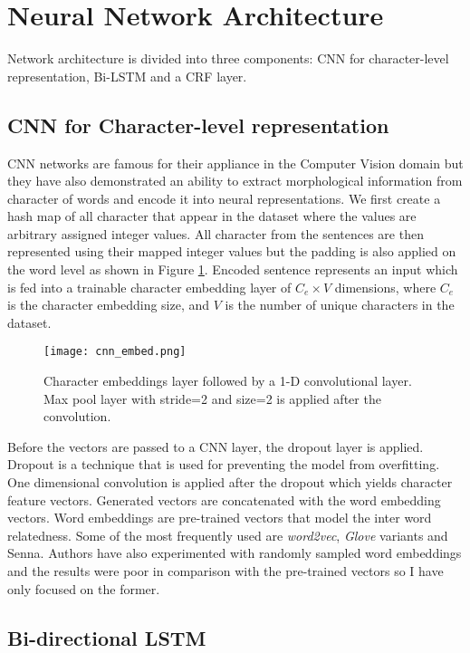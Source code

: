 \section{Neural Network Architecture}
Network architecture is divided into three components: CNN for character-level
representation, Bi-LSTM and a CRF layer.

\subsection{CNN for Character-level representation}
CNN networks are famous for their appliance in the Computer Vision domain but
they have also demonstrated an ability to extract morphological information
from character of words and encode it into neural
representations\cite{cnn_repr}. We first create a hash map of all character
that appear in the dataset where the values are arbitrary assigned integer
values. All character from the sentences are then represented using their 
mapped integer values but the padding is also applied on the word level as
shown in Figure \ref{fig:cnn_embed}.
Encoded sentence represents an input which is fed into a trainable character embedding
layer of $C_e \times V$ dimensions, where $C_e$ is the character embedding size,
and $V$ is the number of unique characters in the dataset.

\begin{figure}
  \caption{Character embeddings layer followed by a 1-D convolutional layer.
  Max pool layer with stride=2 and size=2 is applied after the convolution.}
  \label{fig:cnn_embed}
  \centering
    \texttt{[image: cnn\_embed.png]}
\end{figure}

Before the vectors are passed to a CNN layer, the dropout\cite{dropout} layer is
applied. Dropout is a technique that is used for preventing the model from
overfitting\cite{overfit}. One dimensional convolution is applied after the dropout which
yields character feature vectors. Generated vectors are concatenated with the word
embedding vectors\cite{word_embedding}. Word embeddings are pre-trained vectors
that model the inter word relatedness. Some of the most frequently used are
\textit{word2vec}\cite{w2vec}, \textit{Glove} variants\cite{glove} and
Senna\cite{senna}. Authors have also experimented with randomly sampled word
embeddings and the results were poor in comparison with the pre-trained vectors
so I have only focused on the former.

\subsection{Bi-directional LSTM}

